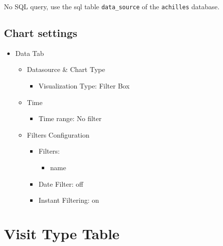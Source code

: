 \documentclass[
]{book}
\providecommand{\tightlist}{%
  \setlength{\itemsep}{0pt}\setlength{\parskip}{0pt}}
\begin{document}
No SQL query, use the sql table \texttt{data\_source} of the \texttt{achilles} database.

\hypertarget{chart-settings-16}{%
\subsection{Chart settings}\label{chart-settings-16}}

\begin{itemize}
\item
  Data Tab

  \begin{itemize}
  \item
    Datasource \& Chart Type

    \begin{itemize}
    \tightlist
    \item
      Visualization Type: Filter Box
    \end{itemize}
  \item
    Time

    \begin{itemize}
    \tightlist
    \item
      Time range: No filter
    \end{itemize}
  \item
    Filters Configuration

    \begin{itemize}
    \item
      Filters:

      \begin{itemize}
      \tightlist
      \item
        name
      \end{itemize}
    \item
      Date Filter: off
    \item
      Instant Filtering: on
    \end{itemize}
  \end{itemize}
\end{itemize}

\hypertarget{visit-type-table}{%
\section{Visit Type Table}\label{visit-type-table}}
\end{document}

